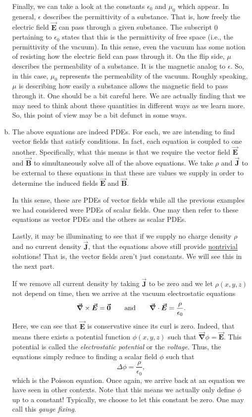 \documentclass[12pt]{article} %
\newcommand{\grad}{\boldsymbol{\vec{\nabla}}}
\newcommand{\vecfieldE}{\boldsymbol{\vec{E}}}
\newcommand{\vecfieldB}{\boldsymbol{\vec{B}}}
\newcommand{\vecfieldJ}{\boldsymbol{\vec{J}}}
\begin{document}
\begin{solution}
\begin{enumerate}[(a)]
    Finally, we can take a look at the constants $\epsilon_0$ and $\mu_0$ which appear.  In general, $\epsilon$ describes the permittivity of a substance.  That is, how freely the electric field $\vecfieldE$ can pass through a given substance.  The subscript $0$ pertaining to $\epsilon_0$ states that this is the permittivity of free space (i.e., the permittivity of the vacuum).  In this sense, even the vacuum has some notion of resisting how the electric field can pass through it. On the flip side, $\mu$ describes the permeability of a substance.  It is the magnetic analog to $\epsilon$. So, in this case, $\mu_0$ represents the permeability of the vacuum.  Roughly speaking, $\mu$ is describing how easily a substance allows the magnetic field to pass through it. One should be a bit careful here.  We are actually finding that we may need to think about these quantities in different ways as we learn more.  So, this point of view may be a bit defunct in some ways.
    
    \item The above equations are indeed PDEs.  For each, we are intending to find vector fields that satisfy conditions.  In fact, each equation is coupled to one another.  Specifically, what this means is that we require the vector field $\vecfieldE$ and $\vecfieldB$ to simultaneously solve all of the above equations. We take $\rho$ and $\vecfieldJ$ to be external to these equations in that these are values we supply in order to determine the induced fields $\vecfieldE$ and $\vecfieldB$.  
    
    In this sense, these are PDEs of vector fields while all the previous examples we had considered were PDEs of scalar fields.  One may then refer to these equations as vector PDEs and the others as scalar PDEs.  
    
    Lastly, it may be illuminating to see that if we supply no charge density $\rho$ and no current density $\vecfieldJ$, that the equations above still provide \underline{nontrivial} solutions! That is, the vector fields aren't just constants.  We will see this in the next part.
    
    If we remove all current density by taking $\vecfieldJ$ to be zero and we let $\rho(x,y,z)$ not depend on time, then we arrive at the vacuum electrostatic equations
    \begin{align*}
        \grad \times \vecfieldE = \zerovec \qquad \textrm{and} \qquad \grad \cdot \vecfieldE = \frac{\rho}{\epsilon_0}.
    \end{align*}
    Here, we can see that $\vecfieldE$ is conservative since its curl is zero.  Indeed, that means there exists a potential function $\phi(x,y,z)$ such that $\grad \phi = \vecfieldE$.  This potential is called the \emph{electrostatic potential} or the \emph{voltage}.  Thus, the equations simply reduce to finding a scalar field $\phi$ such that
    \[
    \Delta \phi = \frac{\rho}{\epsilon_0},
    \]
    which is the Poisson equation.  Once again, we arrive back at an equation we have seen in other contexts. Note that this means we actually only define $\phi$ up to a constant! Typically, we choose to let this constant be zero.  One may call this \emph{gauge fixing}.
    

\end{enumerate}
\end{solution}
\end{document}
